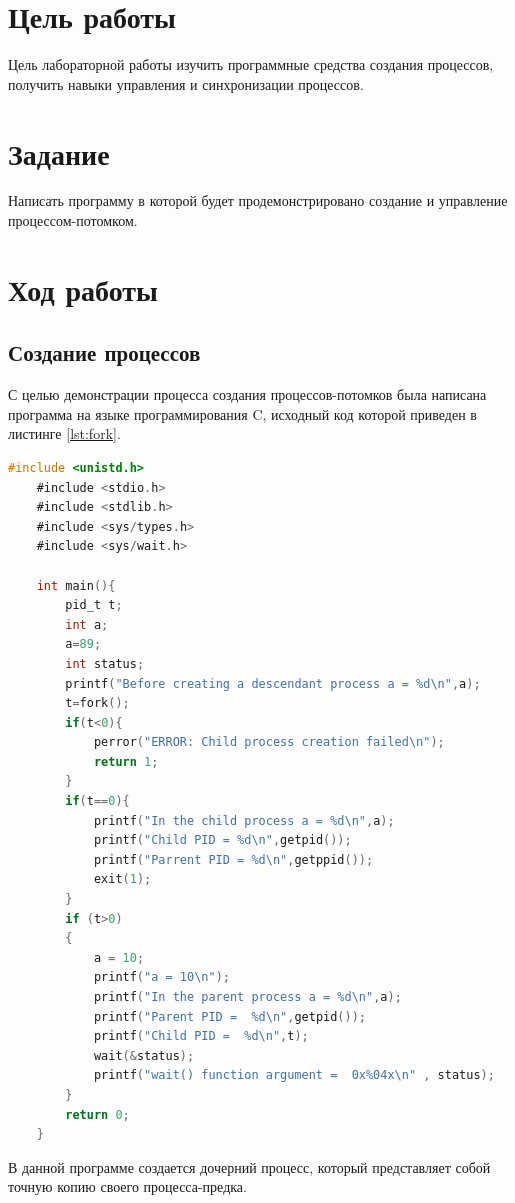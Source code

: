 \documentclass[a4paper,14pt]{extarticle}
\newcommand{\pathToCommonFolder}{/home/denilai/Documents/repos/latex/Common}
\begin{document}
	\thispagestyle{empty}
	
	\newpage
	
\normalsize

\section*{Цель работы}
Цель лабораторной работы изучить программные средства
создания процессов, получить навыки управления и
синхронизации процессов.
\section*{Задание}
Написать программу в которой будет продемонстрировано создание и управление процессом-потомком.


\section*{Ход работы}
\subsection*{Создание процессов}
С целью демонстрации процесса создания процессов-потомков была написана программа на языке программирования C, исходный код которой приведен в листинге \ref{lst:fork}.
\begin{lstlisting}[language=C, caption={fork-demo.c}, label={lst:fork}]
	#include <unistd.h>
	#include <stdio.h>
	#include <stdlib.h>
	#include <sys/types.h>
	#include <sys/wait.h>
	
	int main(){
		pid_t t;
		int a;
		a=89;
		int status;
		printf("Before creating a descendant process a = %d\n",a);
		t=fork();
		if(t<0){
			perror("ERROR: Child process creation failed\n");
			return 1;
		}
		if(t==0){
			printf("In the child process a = %d\n",a);
			printf("Child PID = %d\n",getpid());
			printf("Parrent PID = %d\n",getppid());
			exit(1);
		}
		if (t>0)
		{
			a = 10;
			printf("a = 10\n");
			printf("In the parent process a = %d\n",a);
			printf("Parent PID =  %d\n",getpid());
			printf("Child PID =  %d\n",t);
			wait(&status);
			printf("wait() function argument =  0x%04x\n" , status);
		}
		return 0;
	}
\end{lstlisting}


В данной программе создается дочерний процесс, который представляет собой
точную копию своего процесса-предка.
\end{document}
